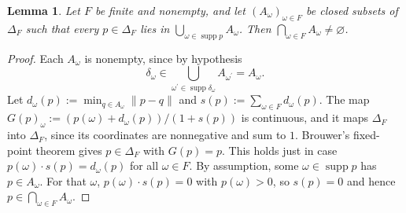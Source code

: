\documentclass[11pt]{article}
\newtheorem{lemma}[theorem]{Lemma}
\theoremstyle{definition}
\theoremstyle{remark}
\newcommand{\supp}{\operatorname{supp}}
\begin{document}
\begin{lemma}\label{lem:kkm}
Let $F$ be finite and nonempty, and let $(A_\omega)_{\omega\in F}$ be closed subsets of $\Delta_F$ such that every $p\in\Delta_F$ lies in $\bigcup_{\omega\in\supp p}A_\omega$. Then $\bigcap_{\omega\in F}A_\omega\ne\varnothing$.
\end{lemma}
\begin{proof}
Each $A_\omega$ is nonempty, since by hypothesis
\[
\delta_\omega\in\bigcup_{\omega^\prime\in\supp \delta_\omega}A_{\omega^\prime}=A_\omega.
\]
Let $d_\omega(p):=\min_{q\in A_\omega}\lVert p-q \rVert$ and $s(p):=\sum_{\omega\in F} d_\omega(p)$. The map $G(p)_\omega:=(p(\omega)+d_\omega(p))/(1+s(p))$ is continuous, and it maps $\Delta_F$ into $\Delta_F$, since its coordinates are nonnegative and sum to $1$. Brouwer's fixed-point theorem gives $p\in\Delta_F$ with $G(p)=p$. This holds just in case $p(\omega)\cdot s(p)=d_\omega(p)$ for all $\omega\in F$. By assumption, some $\omega\in\supp p$ has $p\in A_\omega$. For that $\omega$, $p(\omega)\cdot s(p)=0$ with $p(\omega)>0$, so $s(p)=0$ and hence $p\in\bigcap_{\omega\in F}A_\omega$.
\end{proof}
\end{document}

